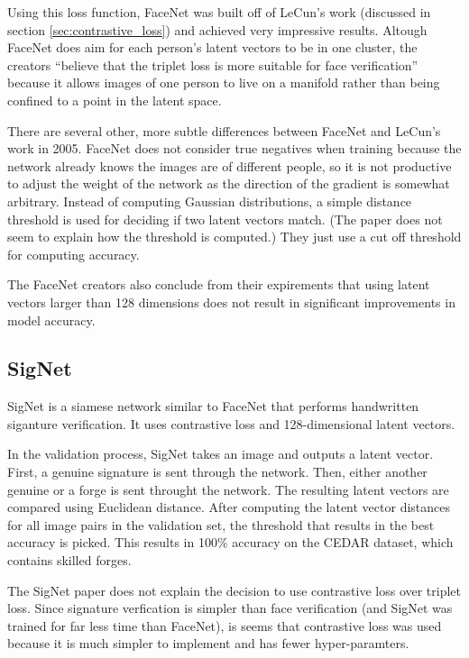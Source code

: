 Using this loss function, FaceNet was built off of LeCun's work (discussed in section \ref{sec:contrastive_loss}) and achieved very impressive results\cite{face_net}.
Altough FaceNet does aim for each person's latent vectors to be in one cluster, the creators ``believe that the triplet loss is more suitable for face verification'' because it allows images of one person to live on a manifold rather than being confined to a point in the latent space\cite{face_net}.

There are several other, more subtle differences between FaceNet and LeCun's work in 2005.
FaceNet does not consider true negatives when training because the network already knows the images are of different people, so it is not productive to adjust the weight of the network as the direction of the gradient is somewhat arbitrary.
Instead of computing Gaussian distributions, a simple distance threshold is used for deciding if two latent vectors match.
(The paper does not seem to explain how the threshold is computed.)
They just use a cut off threshold for computing accuracy.

The FaceNet creators also conclude from their expirements that using latent vectors larger than 128 dimensions does not result in significant improvements in model accuracy\cite{face_net}.


\subsection{SigNet}

SigNet is a siamese network similar to FaceNet that performs handwritten siganture verification.
It uses contrastive loss and 128-dimensional latent vectors.

In the validation process, SigNet takes an image and outputs a latent vector.
First, a genuine signature is sent through the network.
Then, either another genuine or a forge is sent throught the network.
The resulting latent vectors are compared using Euclidean distance.
After computing the latent vector distances for all image pairs in the validation set, the threshold that results in the best accuracy is picked.
This results in 100\% accuracy on the CEDAR dataset, which contains skilled forges.

The SigNet paper does not explain the decision to use contrastive loss over triplet loss.
Since signature verfication is simpler than face verification (and SigNet was trained for far less time than FaceNet), is seems that contrastive loss was used because it is much simpler to implement and has fewer hyper-paramters.


